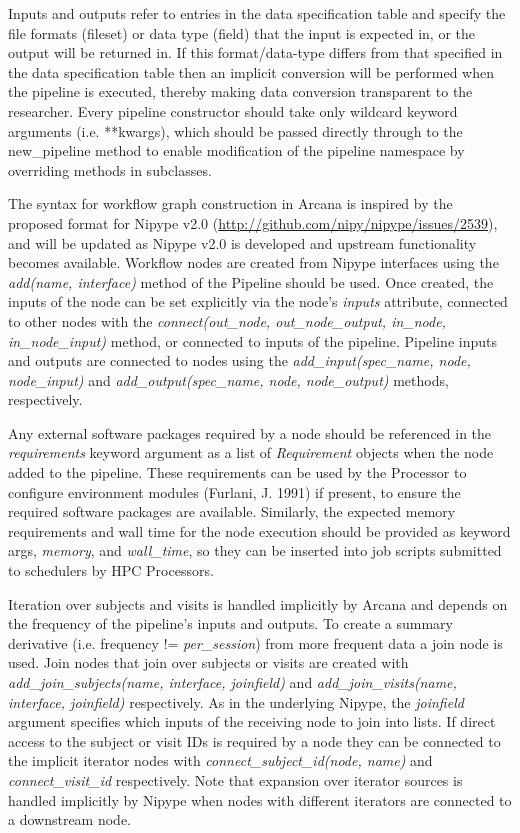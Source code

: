 Inputs and outputs refer to entries in the data specification table and
specify the file formats (fileset) or data type (field) that the input
is expected in, or the output will be returned in. If this
format/data-type differs from that specified in the data specification
table then an implicit conversion will be performed when the pipeline is
executed, thereby making data conversion transparent to the researcher.
Every pipeline constructor should take only wildcard keyword arguments
(i.e. **kwargs), which should be passed directly through to the
new\_pipeline method to enable modification of the pipeline namespace by
overriding methods in subclasses.

The syntax for workflow graph construction in Arcana is inspired by the
proposed format for Nipype v2.0
(\href{http://github.com/nipy/nipype/issues/2539}{http://github.com/nipy/nipype/issues/2539}),
and will be updated as Nipype v2.0 is developed and upstream
functionality becomes available. Workflow nodes are created from Nipype
interfaces using the \emph{add(name, interface)} method of the
Pipeline should be used. Once created, the inputs of the node can be set
explicitly via the node's \emph{inputs} attribute, connected to other
nodes with the \emph{connect(out\_node, out\_node\_output,
in\_node, in\_node\_input)} method, or connected to inputs of the
pipeline. Pipeline inputs and outputs are connected to nodes using the
\emph{add\_input(spec\_name, node, node\_input)} and
\emph{add\_output(spec\_name, node, node\_output)} methods,
respectively.

Any external software packages required by a node should be referenced
in the \emph{requirements} keyword argument as a list of
\emph{Requirement} objects when the node added to the pipeline. These
requirements can be used by the Processor to configure environment
modules (Furlani, J. 1991) if present, to ensure the required software
packages are available. Similarly, the expected memory requirements and
wall time for the node execution should be provided as keyword args,
\emph{memory}, and \emph{wall\_time}, so they can be inserted into job
scripts submitted to schedulers by HPC Processors.

Iteration over subjects and visits is handled implicitly by Arcana and
depends on the frequency of the pipeline's inputs and outputs. To create
a summary derivative (i.e. frequency != \emph{per\_session}) from more
frequent data a join node is used. Join nodes that join over subjects or
visits are created with \emph{add}\_\emph{join\_subjects(name,
interface, joinfield)} and \emph{add\_join\_visits(name,
interface, joinfield)} respectively. As in the underlying Nipype, the
\emph{joinfield} argument specifies which inputs of the receiving node
to join into lists. If direct access to the subject or visit IDs is
required by a node they can be connected to the implicit iterator nodes
with \emph{connect\_subject\_id(node, name)} and
\emph{connect\_visit\_id} respectively. Note that expansion
over iterator sources is handled implicitly by Nipype when nodes with
different iterators are connected to a downstream node.

